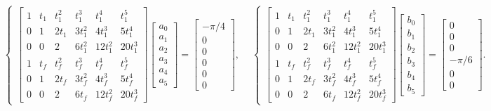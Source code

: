 \documentclass[12pt]{article} %
\numberwithin{equation}{section}  %
\begin{document}
\begin{align}
    &\left\{
    \begin{aligned}
       \begin{bmatrix}
        1 & t_1 & t_1^2 & t_1^3   & t_1^4    & t_1^5    \\
        0 & 1   & 2 t_1 & 3 t_1^2 & 4 t_1^3  & 5 t_1^4  \\
        0 & 0   & 2     & 6 t_1^2 & 12 t_1^2 & 20 t_1^3 \\ 
        1 & t_f & t_f^2 & t_f^3   & t_f^4    & t_f^5    \\
        0 & 1   & 2 t_f & 3 t_f^2 & 4 t_f^3  & 5 t_f^4  \\
        0 & 0   & 2     & 6 t_f   & 12 t_f^2 & 20 t_f^3
    \end{bmatrix} \begin{bmatrix}
        a_0 \\ a_1 \\ a_2 \\ a_3 \\ a_4 \\ a_5
    \end{bmatrix} = \begin{bmatrix}
        - \pi / 4 \\ 0 \\ 0 \\ 0 \\ 0 \\ 0
    \end{bmatrix},
    \end{aligned}
    \right.
    &\left\{
    \begin{aligned}
        \begin{bmatrix}
        1 & t_1 & t_1^2 & t_1^3   & t_1^4    & t_1^5    \\
        0 & 1   & 2 t_1 & 3 t_1^2 & 4 t_1^3  & 5 t_1^4  \\
        0 & 0   & 2     & 6 t_1^2 & 12 t_1^2 & 20 t_1^3 \\ 
        1 & t_f & t_f^2 & t_f^3   & t_f^4    & t_f^5    \\
        0 & 1   & 2 t_f & 3 t_f^2 & 4 t_f^3  & 5 t_f^4  \\
        0 & 0   & 2     & 6 t_f   & 12 t_f^2 & 20 t_f^3
    \end{bmatrix} \begin{bmatrix}
        b_0 \\ b_1 \\ b_2 \\ b_3 \\ b_4 \\ b_5
    \end{bmatrix} = \begin{bmatrix}
        0 \\ 0 \\ 0 \\ - \pi / 6 \\ 0 \\ 0
    \end{bmatrix}.
    \end{aligned}
    \right.
    \label{eq:system_2}
\end{align}
\end{document}
